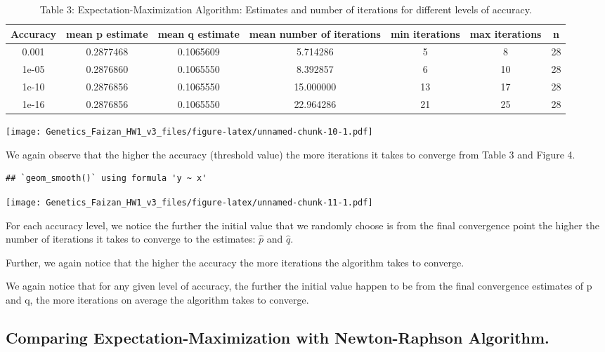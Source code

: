 \documentclass[]{article}
\begin{document}
\begin{table}[t]

\caption{\label{tab:unnamed-chunk-9}Table 3: Expectation-Maximization Algorithm: Estimates and number of iterations for different levels of accuracy.}
\centering
\begin{tabular}{c|c|c|c|c|c|c}
\hline
Accuracy & mean p estimate & mean q estimate & mean number of iterations & min iterations & max iterations & n\\
\hline
0.001 & 0.2877468 & 0.1065609 & 5.714286 & 5 & 8 & 28\\
\hline
1e-05 & 0.2876860 & 0.1065550 & 8.392857 & 6 & 10 & 28\\
\hline
1e-10 & 0.2876856 & 0.1065550 & 15.000000 & 13 & 17 & 28\\
\hline
1e-16 & 0.2876856 & 0.1065550 & 22.964286 & 21 & 25 & 28\\
\hline
\end{tabular}
\end{table}

\texttt{[image: Genetics\_Faizan\_HW1\_v3\_files/figure-latex/unnamed-chunk-10-1.pdf]}

We again observe that the higher the accuracy (threshold value) the more
iterations it takes to converge from Table 3 and Figure 4.

\begin{verbatim}
## `geom_smooth()` using formula 'y ~ x'
\end{verbatim}

\texttt{[image: Genetics\_Faizan\_HW1\_v3\_files/figure-latex/unnamed-chunk-11-1.pdf]}

For each accuracy level, we notice the further the initial value that we
randomly choose is from the final convergence point the higher the
number of iterations it takes to converge to the estimates: \(\hat{p}\)
and \(\hat{q}\).

Further, we again notice that the higher the accuracy the more
iterations the algorithm takes to converge.

We again notice that for any given level of accuracy, the further the
initial value happen to be from the final convergence estimates of p and
q, the more iterations on average the algorithm takes to converge.

\subsection{Comparing Expectation-Maximization with Newton-Raphson
Algorithm.}\label{comparing-expectation-maximization-with-newton-raphson-algorithm.}
\end{document}
